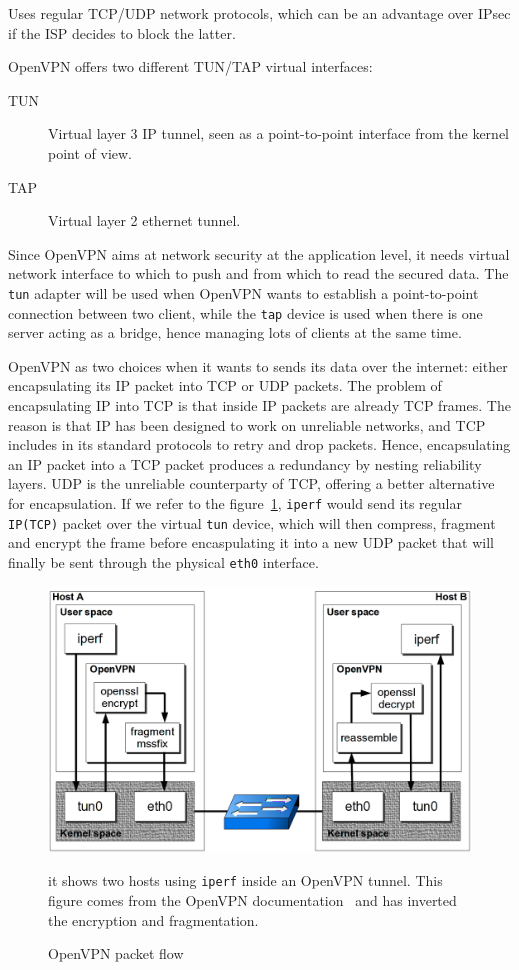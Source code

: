 Uses regular TCP/UDP network protocols, which can be an advantage over IPsec if the ISP decides to block the latter.

OpenVPN offers two different TUN/TAP virtual interfaces:
\begin{description}
	\item[TUN] Virtual layer 3 IP tunnel, seen as a point-to-point interface from the kernel point of view.
	\item[TAP] Virtual layer 2 ethernet tunnel.
\end{description}

Since OpenVPN aims at network security at the application level, it needs virtual network interface to which to push and from which to read the secured data.
The \texttt{tun} adapter will be used when OpenVPN wants to establish a point-to-point connection between two client, while the \texttt{tap} device is used when there is one server acting as a bridge, hence managing lots of clients at the same time.

OpenVPN as two choices when it wants to sends its data over the internet: either encapsulating its IP packet into TCP or UDP packets.
The problem of encapsulating IP into TCP is that inside IP packets are already TCP frames.
The reason is that IP has been designed to work on unreliable networks, and TCP includes in its standard protocols to retry and drop packets.
Hence, encapsulating an IP packet into a TCP packet produces a redundancy by nesting reliability layers.
UDP is the unreliable counterparty of TCP, offering a better alternative for encapsulation.
If we refer to the figure~\ref{fig:openvpn-packet-flow}, \texttt{iperf} would send its regular \texttt{IP(TCP)} packet over the virtual \texttt{tun} device, which will then compress, fragment and encrypt the frame before encaspulating it into a new UDP packet that will finally be sent through the physical \texttt{eth0} interface.

\begin{figure}[ht]
\includegraphics[width=\textwidth]{OpenVPN-packetflow}
\caption{OpenVPN packet flow}{it shows two hosts using \texttt{iperf} inside an OpenVPN tunnel. This figure comes from the OpenVPN documentation~\cite{openvpn-doc-workflow} and has inverted the encryption and fragmentation.}
\label{fig:openvpn-packet-flow}
\end{figure}

